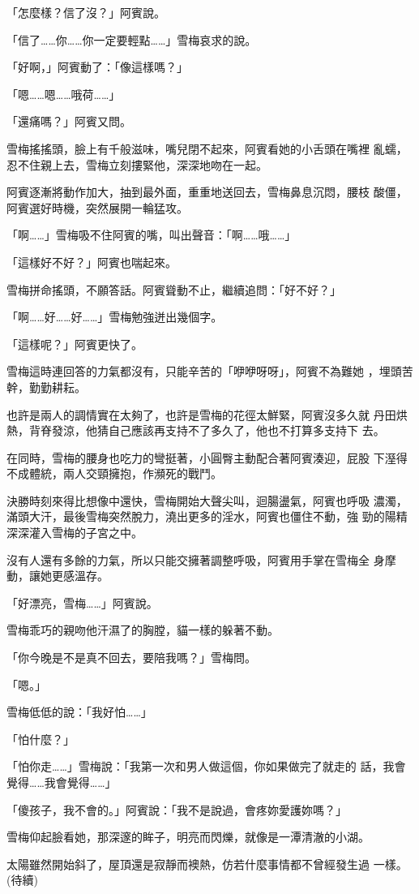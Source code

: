 「怎麼樣？信了沒？」阿賓說。

「信了……你……你一定要輕點……」雪梅哀求的說。

「好啊，」阿賓動了：「像這樣嗎？」

「嗯……嗯……哦荷……」

「還痛嗎？」阿賓又問。

雪梅搖搖頭，臉上有千般滋味，嘴兒閉不起來，阿賓看她的小舌頭在嘴裡
亂蠕，忍不住親上去，雪梅立刻摟緊他，深深地吻在一起。

阿賓逐漸將動作加大，抽到最外面，重重地送回去，雪梅鼻息沉悶，腰枝
酸僵，阿賓選好時機，突然展開一輪猛攻。

「啊……」雪梅吸不住阿賓的嘴，叫出聲音：「啊……哦……」

「這樣好不好？」阿賓也喘起來。

雪梅拼命搖頭，不願答話。阿賓聳動不止，繼續追問：「好不好？」

「啊……好……好……」雪梅勉強迸出幾個字。

「這樣呢？」阿賓更快了。

雪梅這時連回答的力氣都沒有，只能辛苦的「咿咿呀呀」，阿賓不為難她
，埋頭苦幹，勤勤耕耘。

也許是兩人的調情實在太夠了，也許是雪梅的花徑太鮮緊，阿賓沒多久就
丹田烘熱，背脊發涼，他猜自己應該再支持不了多久了，他也不打算多支持下
去。

在同時，雪梅的腰身也吃力的彎挺著，小圓臀主動配合著阿賓湊迎，屁股
下溼得不成體統，兩人交頸擁抱，作瀕死的戰鬥。

決勝時刻來得比想像中還快，雪梅開始大聲尖叫，迴腸盪氣，阿賓也呼吸
濃濁，滿頭大汗，最後雪梅突然脫力，澆出更多的淫水，阿賓也僵住不動，強
勁的陽精深深灌入雪梅的子宮之中。

沒有人還有多餘的力氣，所以只能交擁著調整呼吸，阿賓用手掌在雪梅全
身摩動，讓她更感溫存。

「好漂亮，雪梅……」阿賓說。

雪梅乖巧的親吻他汗濕了的胸膛，貓一樣的躲著不動。

「你今晚是不是真不回去，要陪我嗎？」雪梅問。

「嗯。」

雪梅低低的說：「我好怕……」

「怕什麼？」

「怕你走……」雪梅說：「我第一次和男人做這個，你如果做完了就走的
話，我會覺得……我會覺得……」

「傻孩子，我不會的。」阿賓說：「我不是說過，會疼妳愛護妳嗎？」

雪梅仰起臉看她，那深邃的眸子，明亮而閃爍，就像是一潭清澈的小湖。

太陽雖然開始斜了，屋頂還是寂靜而襖熱，仿若什麼事情都不曾經發生過
一樣。　
　
　
(待續)










